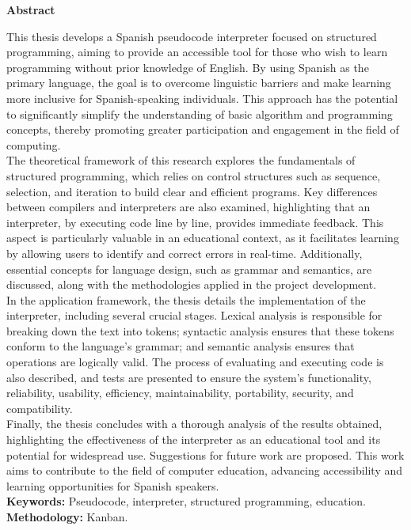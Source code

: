 \begin{spacing}{1.3}
  \begin{center}
    \Large \textbf{Abstract}
  \end{center}
  This thesis develops a Spanish pseudocode interpreter focused on structured programming, aiming to provide an accessible tool for those who wish to learn programming without prior knowledge of English. By using Spanish as the primary language, the goal is to overcome linguistic barriers and make learning more inclusive for Spanish-speaking individuals. This approach has the potential to significantly simplify the understanding of basic algorithm and programming concepts, thereby promoting greater participation and engagement in the field of computing. \\
  The theoretical framework of this research explores the fundamentals of structured programming, which relies on control structures such as sequence, selection, and iteration to build clear and efficient programs. Key differences between compilers and interpreters are also examined, highlighting that an interpreter, by executing code line by line, provides immediate feedback. This aspect is particularly valuable in an educational context, as it facilitates learning by allowing users to identify and correct errors in real-time. Additionally, essential concepts for language design, such as grammar and semantics, are discussed, along with the methodologies applied in the project development. \\
  In the application framework, the thesis details the implementation of the interpreter, including several crucial stages. Lexical analysis is responsible for breaking down the text into tokens; syntactic analysis ensures that these tokens conform to the language's grammar; and semantic analysis ensures that operations are logically valid. The process of evaluating and executing code is also described, and tests are presented to ensure the system's functionality, reliability, usability, efficiency, maintainability, portability, security, and compatibility. \\
  Finally, the thesis concludes with a thorough analysis of the results obtained, highlighting the effectiveness of the interpreter as an educational tool and its potential for widespread use. Suggestions for future work are proposed. This work aims to contribute to the field of computer education, advancing accessibility and learning opportunities for Spanish speakers. \\
  \textbf{Keywords:} Pseudocode, interpreter, structured programming, education. \\
  \textbf{Methodology:} Kanban.
\end{spacing}
